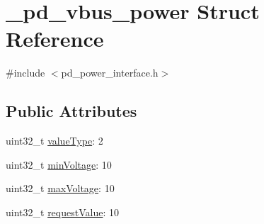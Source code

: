 \hypertarget{struct__pd__vbus__power}{\section{\-\_\-pd\-\_\-vbus\-\_\-power Struct Reference}
\label{struct__pd__vbus__power}
}


{\ttfamily \#include $<$pd\-\_\-power\-\_\-interface.\-h$>$}

\subsection*{Public Attributes}
\begin{DoxyCompactItemize}
\item 
uint32\-\_\-t \hyperlink{struct__pd__vbus__power_a7ab0e68db9780ac66f580f2f5c9b7628}{value\-Type}\-: 2
\item 
uint32\-\_\-t \hyperlink{struct__pd__vbus__power_a4a38147fb5014bae4ac87fb0e327ea43}{min\-Voltage}\-: 10
\item 
uint32\-\_\-t \hyperlink{struct__pd__vbus__power_a62905771ed26603c0bb6ee9c9a15ce55}{max\-Voltage}\-: 10
\item 
uint32\-\_\-t \hyperlink{struct__pd__vbus__power_a81446f906812d534ba558ac6ce2eb863}{request\-Value}\-: 10
\end{DoxyCompactItemize}



